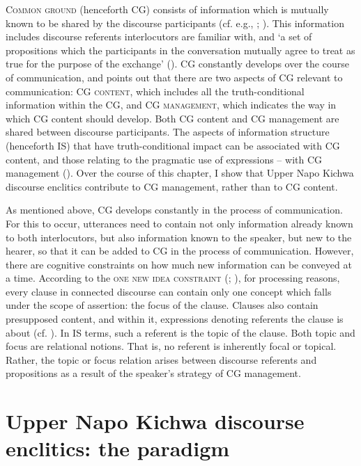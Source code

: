 \documentclass[output=paper]{langscibook}
\begin{document}
\textsc{Common ground} (henceforth CG) consists of information which is mutually known to be shared by the discourse participants (cf. e.g., \citealt{Stalnaker1974}; \citealt{Clark1996}). This information includes discourse referents interlocutors are familiar with, and ‘a set of propositions which the participants in the conversation mutually agree to treat as true for the purpose of the exchange’ (\citealt{Stalnaker1978}). CG constantly develops over the course of communication, and \cite{Krifka2007} points out that there are two aspects of CG relevant to communication: CG \textsc{content}, which includes all the truth-conditional information within the CG, and CG \textsc{management}, which indicates the way in which CG content should develop. Both CG content and CG management are shared between discourse participants. The aspects of information structure (henceforth IS) that have truth-conditional impact can be associated with CG content, and those relating to the pragmatic use of expressions – with CG management (\citealt[18]{Krifka2007}). Over the course of this chapter, I show that Upper Napo Kichwa discourse enclitics contribute to CG management, rather than to CG content.

As mentioned above, CG develops constantly in the process of communication. For this to occur, utterances need to contain not only information already known to both interlocutors, but also information known to the speaker, but new to the hearer, so that it can be added to CG in the process of communication. However, there are cognitive constraints on how much new information can be conveyed at a time. According to the \textsc{one new idea constraint} (\citealt{Chafe1987}; \citealt{Chafe1994}), for processing reasons, every clause in connected discourse can contain only one concept which falls under the scope of assertion: the focus of the clause. Clauses also contain presupposed content, and within it, expressions denoting referents the clause is about (cf. \citealt[127]{Lambrecht1994}). In IS terms, such a referent is the topic of the clause. Both topic and focus are relational notions. That is, no referent is inherently focal or topical. Rather, the topic or focus relation arises between discourse referents and propositions as a result of the speaker’s strategy of CG management. 


\section{Upper Napo Kichwa discourse enclitics: the paradigm}\label{s:kg2}
\end{document}
